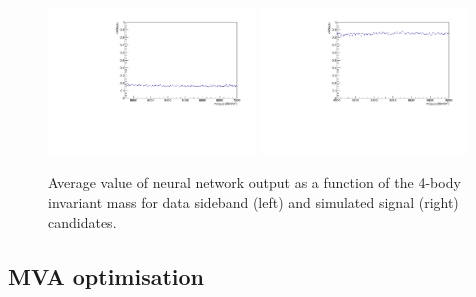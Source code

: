 \begin{figure}
\centering
\includegraphics[width=0.49\textwidth]{Lmumu/figs/NNout_profile_vs_LbMM_bkgData.pdf}
\includegraphics[width=0.49\textwidth]{Lmumu/figs/NNout_profile_vs_LbMM_MCsignal.pdf}
\caption{Average value of neural network output as a function of the 4-body invariant mass 
for data sideband (left) and simulated signal (right) candidates.}
\label{fig:Lb_NNprofiles}
\end{figure}








\subsection{MVA optimisation}
\label{sec:Lb_mva_opt}

